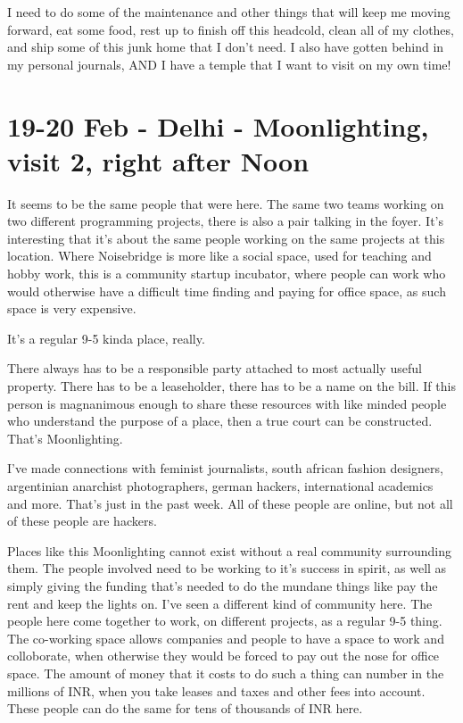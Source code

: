 \documentclass[11pt]{amsart}
\begin{document}
I need to do some of the maintenance and other things that will keep me moving forward, eat some food, rest up to finish off this headcold, clean all of my clothes, and ship some of this junk home that I don't need. I also have gotten behind in my personal journals, AND I have a temple that I want to visit on my own time!

\section{19-20 Feb - Delhi - Moonlighting, visit 2, right after Noon}

It seems to be the same people that were here. The same two teams working on two different programming projects, there is also a pair talking in the foyer. It's interesting that it's about the same people working on the same projects at this location. Where Noisebridge is more like a social space, used for teaching and hobby work, this is a community startup incubator, where people can work who would otherwise have a difficult time finding and paying for office space, as such space is very expensive.

It's a regular 9-5 kinda place, really.

There always has to be a responsible party attached to most actually useful property. There has to be a leaseholder, there has to be a name on the bill. If this person is magnanimous enough to share these resources with like minded people who understand the purpose of a place, then a true court can be constructed. That's Moonlighting.

I've made connections with feminist journalists, south african fashion designers, argentinian anarchist photographers, german hackers, international academics and more. That's just in the past week. All of these people are online, but not all of these people are hackers.

Places like this Moonlighting cannot exist without a real community surrounding them.  The people involved need to be working to it's success in spirit, as well as simply giving the funding that's needed to do the mundane things like pay the rent and keep the lights on. I've seen a different kind of community here. The people here come together to work, on different projects, as a regular 9-5 thing. The co-working space allows companies and people to have a space to work and colloborate, when otherwise they would be forced to pay out the nose for office space. The amount of money that it costs to do such a thing can number in the millions of INR, when you take leases and taxes and other fees into account. These people can do the same for tens of thousands of INR here.
\end{document}
